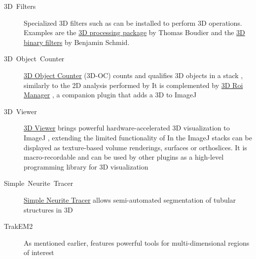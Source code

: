 \begin{description}
\item [{3D\ Filters}] Specialized 3D
filters such as 
can be installed to perform 3D operations. Examples are the \href{http://imagejdocu.tudor.lu/doku.php?id=plugin:morphology:3d_binary_morphological_filters:start}{3D processing package}
by Thomas Boudier \cite{Iannuccelli:2010p13791} and the \href{http://fiji.sc/wiki/index.php/3D_Binary_Filters}{3D binary filters}
by Benjamin Schmid.
\item [{3D\ Object\ Counter}] \href{http://imagejdocu.tudor.lu/doku.php?id=plugin:analysis:3d_object_counter:start}{3D Object Counter}
(3D-OC) counts
and qualifies 3D objects in a stack \cite{Bolte:2006p2466}, similarly
to the 2D analysis performed by 
It is complemented by \href{http://imagejdocu.tudor.lu/doku.php?id=plugin:stacks:3d_roi_manager:start}{3D Roi Manager}
\cite{Iannuccelli:2010p13791}, a companion plugin that adds a 3D
 to ImageJ
\item [{3D\ Viewer}] \href{http://3dviewer.neurofly.de/}{3D Viewer} brings
powerful hardware-accelerated 3D visualization to ImageJ \cite{Schmid:2010p18702},
extending the limited functionality of 
In the ImageJ  stacks can be displayed as
texture-based volume renderings, surfaces or orthoslices. It is macro-recordable
and can be used by other plugins as a high-level programming library
for 3D visualization
\item [{Simple\ Neurite\ Tracer}] \href{http://fiji.sc/wiki/index.php/Simple_Neurite_Tracer}{Simple Neurite Tracer}
allows semi-automated segmentation of
tubular structures in 3D \cite{Longair:2011p20768}
\item [{TrakEM2}] As mentioned earlier,  features
powerful tools for multi-dimensional regions of interest \cite{Cardona:2010p18306}
\end{description}



